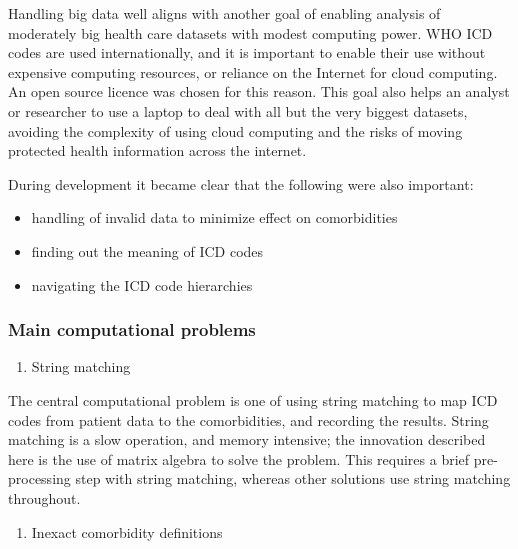 \documentclass[article]{jss}
\providecommand{\tightlist}{%
  \setlength{\itemsep}{0pt}\setlength{\parskip}{0pt}}
\begin{document}
Handling big data well aligns with another goal of enabling analysis of
moderately big health care datasets with modest computing power. WHO ICD
codes are used internationally, and it is important to enable their use
without expensive computing resources, or reliance on the Internet for
cloud computing. An open source licence
\citep[GNU General Public License v3.0][]{gplv3} was chosen for this
reason. This goal also helps an analyst or researcher to use a laptop to
deal with all but the very biggest datasets, avoiding the complexity of
using cloud computing and the risks of moving protected health
information across the internet.

During development it became clear that the following were also
important:

\begin{itemize}
\tightlist
\item
  handling of invalid data to minimize effect on comorbidities
\item
  finding out the meaning of ICD codes
\item
  navigating the ICD code hierarchies
\end{itemize}

\hypertarget{main-computational-problems}{%
\subsubsection{Main computational
problems}\label{main-computational-problems}}

\begin{enumerate}
\def\labelenumi{\arabic{enumi}.}
\tightlist
\item
  String matching
\end{enumerate}

The central computational problem is one of using string matching to map
ICD codes from patient data to the comorbidities, and recording the
results. String matching is a slow operation, and memory intensive; the
innovation described here is the use of matrix algebra to solve the
problem. This requires a brief pre-processing step with string matching,
whereas other solutions use string matching throughout.

\begin{enumerate}
\def\labelenumi{\arabic{enumi}.}
\setcounter{enumi}{1}
\tightlist
\item
  Inexact comorbidity definitions
\end{enumerate}
\end{document}
